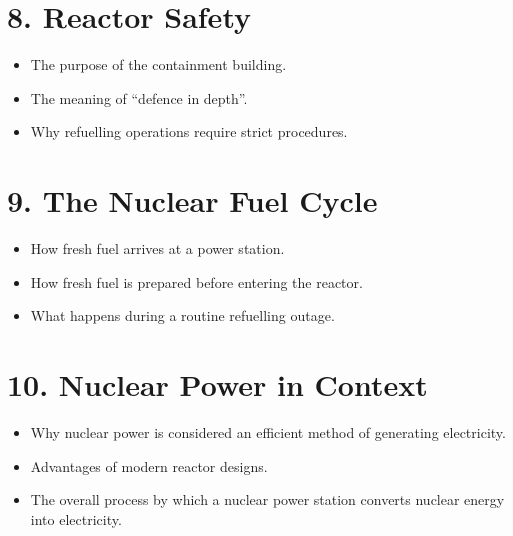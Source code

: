 \documentclass[11pt,a4paper]{article}
\begin{document}
\section*{8. Reactor Safety}

\begin{itemize}[leftmargin=*]
    \item The purpose of the containment building.
    \item The meaning of ``defence in depth''.
    \item Why refuelling operations require strict procedures.
\end{itemize}

\section*{9. The Nuclear Fuel Cycle}

\begin{itemize}[leftmargin=*]
    \item How fresh fuel arrives at a power station.
    \item How fresh fuel is prepared before entering the reactor.
    \item What happens during a routine refuelling outage.
\end{itemize}

\section*{10. Nuclear Power in Context}

\begin{itemize}[leftmargin=*]
    \item Why nuclear power is considered an efficient method of generating electricity.
    \item Advantages of modern reactor designs.
    \item The overall process by which a nuclear power station converts nuclear energy into electricity.
\end{itemize}
\end{document}
